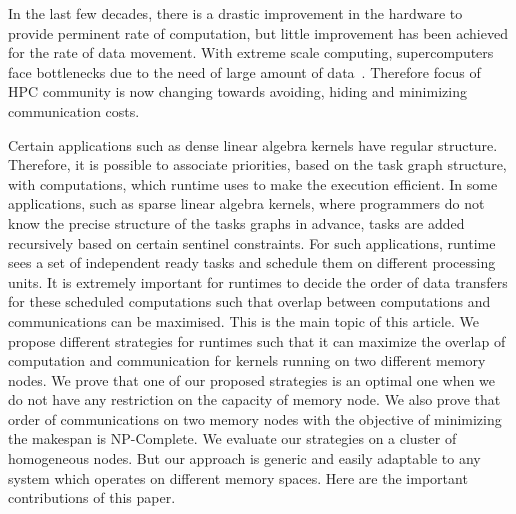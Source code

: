 \documentclass[sigconf]{acmart}
\begin{document}


In the last few decades, there is a drastic improvement in the hardware to provide perminent rate of computation, but little improvement has been achieved for the rate of data movement. With extreme scale computing, supercomputers face bottlenecks due to the need of large amount of data~\cite{ascaccommitteereport2014,yelick2016}. Therefore focus of HPC community is now changing towards avoiding, hiding and minimizing communication costs.


Certain applications such as dense linear algebra kernels have regular structure. Therefore, it is possible to associate priorities, based on the task graph structure, with computations, which runtime uses to make the execution efficient. In some applications, such as sparse linear algebra kernels, where programmers do not know the precise structure of the tasks graphs in advance,  tasks are added recursively based on certain sentinel constraints. For such applications, runtime sees a set of independent ready tasks and schedule them on different processing units. It is extremely important for runtimes to decide the order of data transfers for these scheduled computations such that overlap between computations and communications can be maximised. This is the main topic of this article. We propose different strategies for runtimes such that it can maximize the overlap of computation and communication for kernels running on two different memory nodes. We prove that one of our proposed strategies is an optimal one when we do not have any restriction on the capacity of memory node. We also prove that order of communications on two memory nodes  with the objective of minimizing the makespan is  NP-Complete. We evaluate our strategies on a cluster of homogeneous nodes. But our approach is generic and easily adaptable to any system which operates on different memory spaces. Here are the important contributions of this paper.
\end{document}
